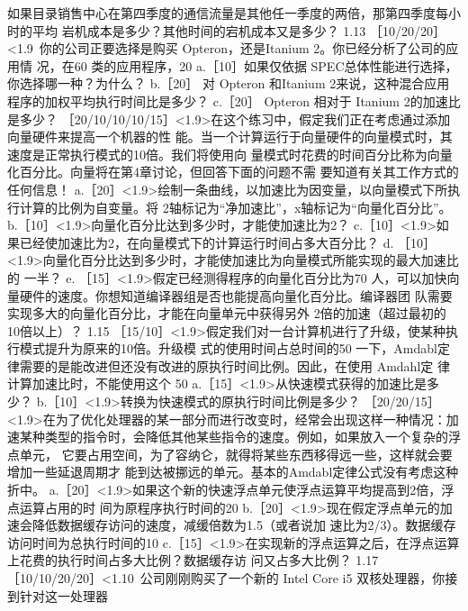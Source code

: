 如果目录销售中心在第四季度的通信流量是其他任一季度的两倍，那第四季度每小时的平均
岩机成本是多少？其他时间的宕机成本又是多少？
1.13
［10/20/20］<1.9~你的公司正要选择是购买 Opteron，还是Itanium 2。你已经分析了公司的应用情
况，在60%
类的应用程序，20%
a.［10］如果仅依据 SPEC总体性能进行选择，你选择哪一种？为什么？
b.［20］ 对 Opteron 和Itanium 2来说，这种混合应用程序的加权平均执行时间比是多少？
c.［20］ Opteron 相对于 Itanium 2的加速比是多少？
［20/10/10/10/15］<1.9>在这个练习中，假定我们正在考虑通过添加向量硬件来提高一个机器的性
能。当一个计算运行于向量硬件的向量模式时，其速度是正常执行模式的10倍。我们将使用向
量模式时花费的时间百分比称为向量化百分比。向量将在第4章讨论，但回答下面的问题不需
要知道有关其工作方式的任何信息！
a.［20］<1.9>绘制一条曲线，以加速比为因变量，以向量模式下所执行计算的比例为自变量。将
2轴标记为“净加速比”，x轴标记为“向量化百分比”。
b.［10］<1.9>向量化百分比达到多少时，才能使加速比为2？
c.［10］<1.9>如果已经使加速比为2，在向量模式下的计算运行时间占多大百分比？
d. ［10］<1.9>向量化百分比达到多少时，才能使加速比为向量模式所能实现的最大加速比的
一半？
e. ［15］<1.9>假定已经测得程序的向量化百分比为70%
人，可以加快向量硬件的速度。你想知道编译器组是否也能提高向量化百分比。编译器团
队需要实现多大的向量化百分比，才能在向量单元中获得另外 2倍的加速（超过最初的
10倍以上）？
1.15 ［15/10］<1.9>假定我们对一台计算机进行了升级，使某种执行模式提升为原来的10倍。升级模
式的使用时间占总时间的50%
一下，Amdabl定律需要的是能改进但还没有改进的原执行时间比例。因此，在使用 Amdahl定
律计算加速比时，不能使用这个 50%
a.［15］<1.9>从快速模式获得的加速比是多少？
b.［10］<1.9>转换为快速模式的原执行时间比例是多少？
［20/20/15］<1.9>在为了优化处理器的某一部分而进行改变时，经常会出现这样一种情况：加
速某种类型的指令时，会降低其他某些指令的速度。例如，如果放入一个复杂的浮点单元，
它要占用空间，为了容纳仑，就得将某些东西移得远一些，这样就会要增加一些延退周期才
能到达被挪远的单元。基本的Amdabl定律公式没有考虑这种折中。
a.［20］<1.9>如果这个新的快速浮点单元使浮点运算平均提高到2倍，浮点运算占用的时
间为原程序执行时间的20%
b.［20］<1.9>现在假定浮点单元的加速会降低数据缓存访问的速度，减缓倍数为1.5（或者说加
速比为2/3）。数据缓存访问时间为总执行时间的10%
c.［15］<1.9>在实现新的浮点运算之后，在浮点运算上花费的执行时间占多大比例？数据缓存访
问又占多大比例？
1.17［10/10/20/20］<1.10~公司刚刚购买了一个新的 Intel Core i5 双核处理器，你接到针对这一处理器
